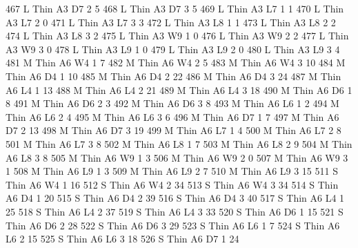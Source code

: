 \documentclass{article}
\begin{document}
\begin{Schunk}
\begin{Soutput}
467       L   Thin   A3      D7     2     5
468       L   Thin   A3      D7     3     5
469       L   Thin   A3      L7     1     1
470       L   Thin   A3      L7     2     0
471       L   Thin   A3      L7     3     3
472       L   Thin   A3      L8     1     1
473       L   Thin   A3      L8     2     2
474       L   Thin   A3      L8     3     2
475       L   Thin   A3      W9     1     0
476       L   Thin   A3      W9     2     2
477       L   Thin   A3      W9     3     0
478       L   Thin   A3      L9     1     0
479       L   Thin   A3      L9     2     0
480       L   Thin   A3      L9     3     4
481       M   Thin   A6      W4     1     7
482       M   Thin   A6      W4     2     5
483       M   Thin   A6      W4     3    10
484       M   Thin   A6      D4     1    10
485       M   Thin   A6      D4     2    22
486       M   Thin   A6      D4     3    24
487       M   Thin   A6      L4     1    13
488       M   Thin   A6      L4     2    21
489       M   Thin   A6      L4     3    18
490       M   Thin   A6      D6     1     8
491       M   Thin   A6      D6     2     3
492       M   Thin   A6      D6     3     8
493       M   Thin   A6      L6     1     2
494       M   Thin   A6      L6     2     4
495       M   Thin   A6      L6     3     6
496       M   Thin   A6      D7     1     7
497       M   Thin   A6      D7     2    13
498       M   Thin   A6      D7     3    19
499       M   Thin   A6      L7     1     4
500       M   Thin   A6      L7     2     8
501       M   Thin   A6      L7     3     8
502       M   Thin   A6      L8     1     7
503       M   Thin   A6      L8     2     9
504       M   Thin   A6      L8     3     8
505       M   Thin   A6      W9     1     3
506       M   Thin   A6      W9     2     0
507       M   Thin   A6      W9     3     1
508       M   Thin   A6      L9     1     3
509       M   Thin   A6      L9     2     7
510       M   Thin   A6      L9     3    15
511       S   Thin   A6      W4     1    16
512       S   Thin   A6      W4     2    34
513       S   Thin   A6      W4     3    34
514       S   Thin   A6      D4     1    20
515       S   Thin   A6      D4     2    39
516       S   Thin   A6      D4     3    40
517       S   Thin   A6      L4     1    25
518       S   Thin   A6      L4     2    37
519       S   Thin   A6      L4     3    33
520       S   Thin   A6      D6     1    15
521       S   Thin   A6      D6     2    28
522       S   Thin   A6      D6     3    29
523       S   Thin   A6      L6     1     7
524       S   Thin   A6      L6     2    15
525       S   Thin   A6      L6     3    18
526       S   Thin   A6      D7     1    24

\end{Soutput}
\end{Schunk}
\end{document}
